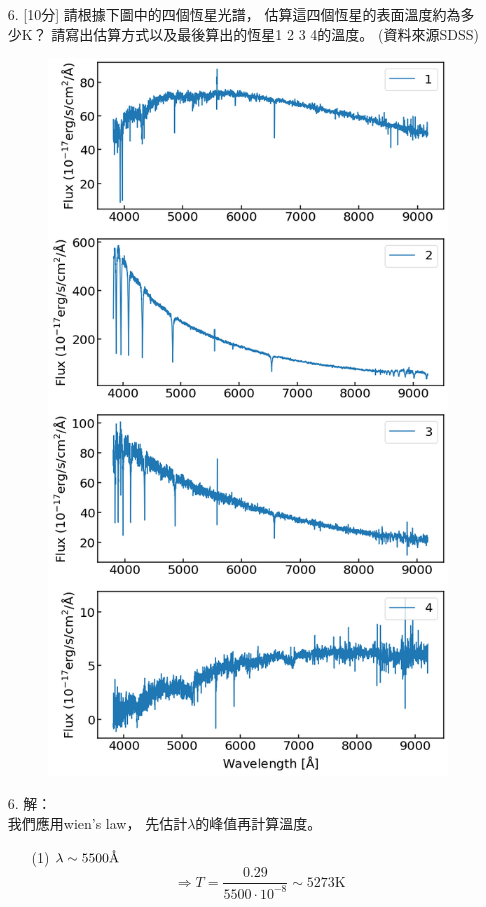 \documentclass{article}
\theoremstyle{definition}
\begin{document}
\begin{enumerate}
	\item[6.] [10分] 請根據下圖中的四個恆星光譜，
		估算這四個恆星的表面溫度約為多少K？
		請寫出估算方式以及最後算出的恆星1 2 3 4的溫度。
		(資料來源SDSS)
		\begin{figure}
			\centering
			\includegraphics[scale = 0.5]{hw1-3.png}
			\caption{}
			\label{fig3}
		\end{figure}

	\item[6.] 解：\\
		我們應用wien's law，
		先估計$\lambda$的峰值再計算溫度。
		\begin{enumerate}
			\item[(1)] $\lambda \sim 5500 \text{\r{A}}$
				\[
					\Rightarrow T = \frac{0.29}{5500 \cdot 10^{-8}} \sim 5273 \text{K}
				\]


\end{enumerate}
\end{enumerate}
\end{document}

